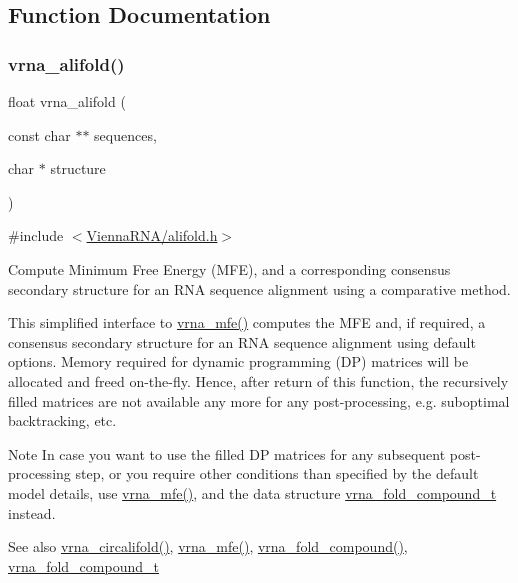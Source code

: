 \subsection{Function Documentation}
\mbox{\label{group__consensus__mfe__fold_ga6c9d3bef3e92c6d423ffac9f981418c1}} 
\subsubsection{\texorpdfstring{vrna\+\_\+alifold()}{vrna\_alifold()}}
{\footnotesize\ttfamily float vrna\+\_\+alifold (\begin{DoxyParamCaption}\item[{const char $\ast$$\ast$}]{sequences,  }\item[{char $\ast$}]{structure }\end{DoxyParamCaption})}



{\ttfamily \#include $<$\hyperlink{alifold_8h}{Vienna\+R\+N\+A/alifold.\+h}$>$}



Compute Minimum Free Energy (M\+FE), and a corresponding consensus secondary structure for an R\+NA sequence alignment using a comparative method. 

This simplified interface to \hyperlink{group__mfe__fold_gabd3b147371ccf25c577f88bbbaf159fd}{vrna\+\_\+mfe()} computes the M\+FE and, if required, a consensus secondary structure for an R\+NA sequence alignment using default options. Memory required for dynamic programming (DP) matrices will be allocated and free\textquotesingle{}d on-\/the-\/fly. Hence, after return of this function, the recursively filled matrices are not available any more for any post-\/processing, e.\+g. suboptimal backtracking, etc.

\begin{DoxyNote}{Note}
In case you want to use the filled DP matrices for any subsequent post-\/processing step, or you require other conditions than specified by the default model details, use \hyperlink{group__mfe__fold_gabd3b147371ccf25c577f88bbbaf159fd}{vrna\+\_\+mfe()}, and the data structure \hyperlink{group__fold__compound_ga1b0cef17fd40466cef5968eaeeff6166}{vrna\+\_\+fold\+\_\+compound\+\_\+t} instead.
\end{DoxyNote}
\begin{DoxySeeAlso}{See also}
\hyperlink{group__consensus__mfe__fold_ga17a1be7490468c29c335ba9bffacba53}{vrna\+\_\+circalifold()}, \hyperlink{group__mfe__fold_gabd3b147371ccf25c577f88bbbaf159fd}{vrna\+\_\+mfe()}, \hyperlink{group__fold__compound_ga6601d994ba32b11511b36f68b08403be}{vrna\+\_\+fold\+\_\+compound()}, \hyperlink{group__fold__compound_ga1b0cef17fd40466cef5968eaeeff6166}{vrna\+\_\+fold\+\_\+compound\+\_\+t}
\end{DoxySeeAlso}

